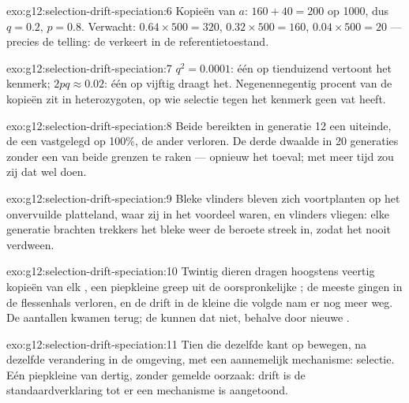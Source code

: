 \begin{solution}{exo:g12:selection-drift-speciation:6}
Kopieën van $a$: $160 + 40 = 200$ op 1000, dus $q = 0.2$, $p = 0.8$.
Verwacht: $0.64 \times 500 = 320$, $0.32 \times 500 = 160$, $0.04
\times 500 = 20$ --- precies de telling: de  verkeert in de
referentietoestand.
\end{solution}

\begin{solution}{exo:g12:selection-drift-speciation:7}
$q^2 = 0.0001$: één op tienduizend vertoont het kenmerk; $2pq \approx
0.02$: één op vijftig draagt het. Negenennegentig procent van de kopieën
zit in heterozygoten, op wie selectie tegen het kenmerk geen vat heeft.
\end{solution}

\begin{solution}{exo:g12:selection-drift-speciation:8}
Beide bereikten in generatie 12 een uiteinde, de een vastgelegd op 100\%,
de ander verloren. De derde dwaalde in 20 generaties zonder een van beide
grenzen te raken --- opnieuw het toeval; met meer tijd zou zij dat wel
doen.
\end{solution}

\begin{solution}{exo:g12:selection-drift-speciation:9}
Bleke vlinders bleven zich voortplanten op het onvervuilde platteland,
waar zij in het voordeel waren, en vlinders vliegen: elke generatie
brachten trekkers het bleke  weer de beroete streek in, zodat het
nooit verdween.
\end{solution}

\begin{solution}{exo:g12:selection-drift-speciation:10}
Twintig dieren dragen hoogstens veertig kopieën van elk , een
piepkleine greep uit de oorspronkelijke ; de meeste gingen in de
flessenhals verloren, en de drift in de kleine  die volgde nam er
nog meer weg. De aantallen kwamen terug; de  kunnen dat niet,
behalve door nieuwe .
\end{solution}

\begin{solution}{exo:g12:selection-drift-speciation:11}
Tien  die dezelfde kant op bewegen, na dezelfde verandering in
de omgeving, met een aannemelijk mechanisme: selectie. Eén piepkleine
 van dertig, zonder gemelde oorzaak: drift is de
standaardverklaring tot er een mechanisme is aangetoond.
\end{solution}

